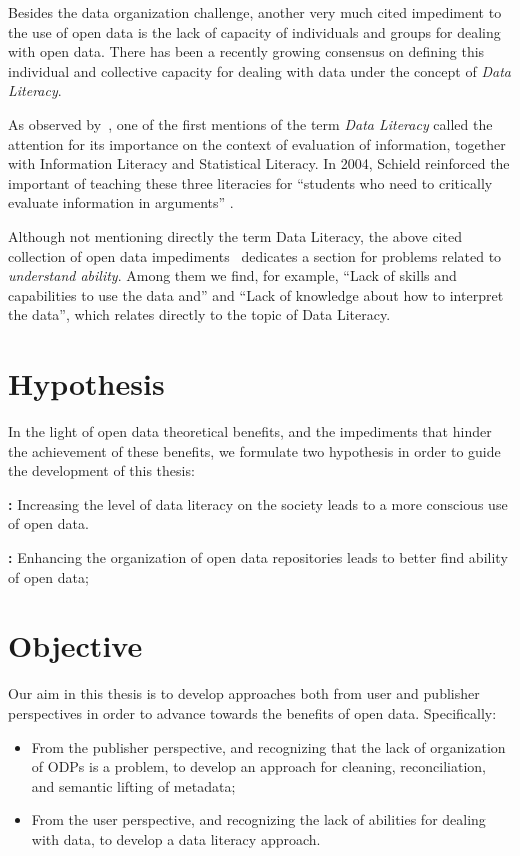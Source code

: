 Besides the data organization challenge, another very much cited impediment to the use of open data is the lack of capacity of individuals and groups for dealing with open data.
There has been a recently growing consensus on defining this individual and collective capacity for dealing with data under the concept of \emph{Data Literacy}.

As observed by~, one of the first mentions of the term \emph{Data Literacy} called the attention for its importance on the context of evaluation of information, together with  Information Literacy and Statistical Literacy. 
In 2004, Schield reinforced the important of teaching these three literacies for ``students who need to critically evaluate information in arguments'' \cite{Schield2004}.

Although not mentioning directly the term Data Literacy, the above cited collection of open data impediments~\cite{Zuiderwijk2012} dedicates a section for problems related to \emph{understand ability}.
Among them we find, for example, ``Lack of skills and capabilities to use the data and'' and ``Lack of knowledge about how to interpret the data'', which relates directly to the topic of Data Literacy.

\section{Hypothesis}

In the light of open data theoretical benefits, and the impediments that hinder the achievement of these benefits, we formulate two hypothesis in order to guide the development of this thesis:

\noindent\textbf{:} Increasing the level of data literacy on the society leads to a more conscious use of open data.

\noindent\textbf{:} Enhancing the organization of open data repositories leads to better find ability of open data;

\section{Objective}

Our aim in this thesis is to develop approaches both from user and publisher perspectives in order to advance towards the benefits of open data. Specifically:
\begin{itemize}
	\item From the publisher perspective, and recognizing that the lack of organization of ODPs is a problem, to develop an approach for cleaning, reconciliation, and semantic lifting of metadata;
	\item From the user perspective, and recognizing the lack of abilities for dealing with data, to develop a data literacy approach.
\end{itemize}

